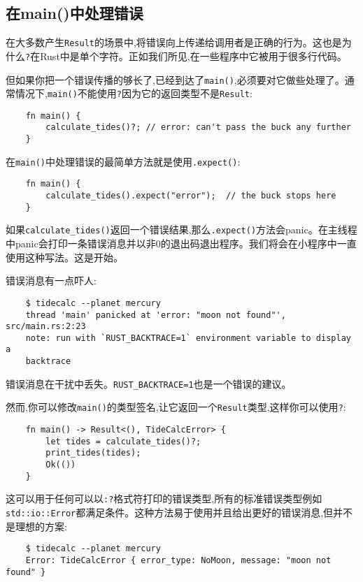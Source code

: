 \subsection{在main()中处理错误}
在大多数产生\texttt{Result}的场景中,将错误向上传递给调用者是正确的行为。这也是为什么\texttt{?}在Rust中是单个字符。正如我们所见,在一些程序中它被用于很多行代码。

但如果你把一个错误传播的够长了,已经到达了\texttt{main()},必须要对它做些处理了。通常情况下,\texttt{main()}不能使用\texttt{?}因为它的返回类型不是\texttt{Result}:
\begin{verbatim}
    fn main() {
        calculate_tides()?; // error: can't pass the buck any further
    }
\end{verbatim}

在\texttt{main()}中处理错误的最简单方法就是使用\texttt{.expect()}:
\begin{verbatim}
    fn main() {
        calculate_tides().expect("error");  // the buck stops here
    }
\end{verbatim}

如果\texttt{calculate\_tides()}返回一个错误结果,那么\texttt{.expect()}方法会panic。在主线程中panic会打印一条错误消息并以非0的退出码退出程序。我们将会在小程序中一直使用这种写法。这是开始。

错误消息有一点吓人:
\begin{verbatim}
    $ tidecalc --planet mercury
    thread 'main' panicked at 'error: "moon not found"', src/main.rs:2:23
    note: run with `RUST_BACKTRACE=1` environment variable to display a
    backtrace
\end{verbatim}
错误消息在干扰中丢失。\texttt{RUST\_BACKTRACE=1}也是一个错误的建议。

然而,你可以修改\texttt{main()}的类型签名,让它返回一个\texttt{Result}类型,这样你可以使用\texttt{?}:
\begin{verbatim}
    fn main() -> Result<(), TideCalcError> {
        let tides = calculate_tides()?;
        print_tides(tides);
        Ok(())
    }
\end{verbatim}

这可以用于任何可以以\texttt{{:?}}格式符打印的错误类型,所有的标准错误类型例如\\
\texttt{std::io::Error}都满足条件。这种方法易于使用并且给出更好的错误消息,但并不是理想的方案:
\begin{verbatim}
    $ tidecalc --planet mercury
    Error: TideCalcError { error_type: NoMoon, message: "moon not found" }
\end{verbatim}

